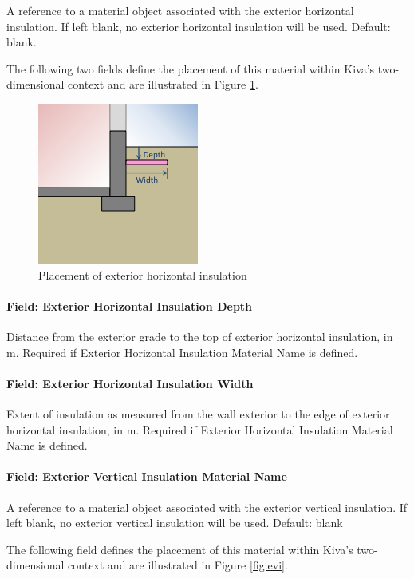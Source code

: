 A reference to a material object associated with the exterior horizontal
insulation. If left blank, no exterior horizontal insulation will be
used. Default: blank.

The following two fields define the placement of this material within
Kiva's two-dimensional context and are illustrated in Figure
\ref{fig:ehi}.

\begin{figure}
\centering
\includegraphics{media/kiva-2d-ehi.png}
\caption{Placement of exterior horizontal insulation\label{fig:ehi}}
\end{figure}

\paragraph{Field: Exterior Horizontal Insulation
Depth}

Distance from the exterior grade to the top of exterior horizontal insulation,
in m. Required if Exterior Horizontal Insulation Material Name is
defined.

\paragraph{Field: Exterior Horizontal Insulation
Width}

Extent of insulation as measured from the wall exterior to the edge of
exterior horizontal insulation, in m. Required if Exterior Horizontal
Insulation Material Name is defined.

\paragraph{Field: Exterior Vertical Insulation Material
Name}

A reference to a material object associated with the exterior vertical
insulation. If left blank, no exterior vertical insulation will be used.
Default: blank

The following field defines the placement of this material within Kiva's
two-dimensional context and are illustrated in Figure \ref{fig:evi}.

